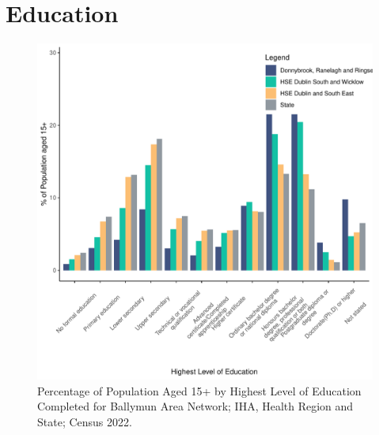 \documentclass{article}
\begin{document}
\section{Education}\label{sect:Edu}
\begin{figure}[H]
	\centering
	\includegraphics[width = 120mm]{../figures/EduED.pdf}
	\caption{Percentage of Population Aged 15+ by Highest Level of Education Completed for Ballymun Area Network; IHA, Health Region and State; Census 2022.}
	\label{fig:vbnv}
	\end{figure}
\end{document}
